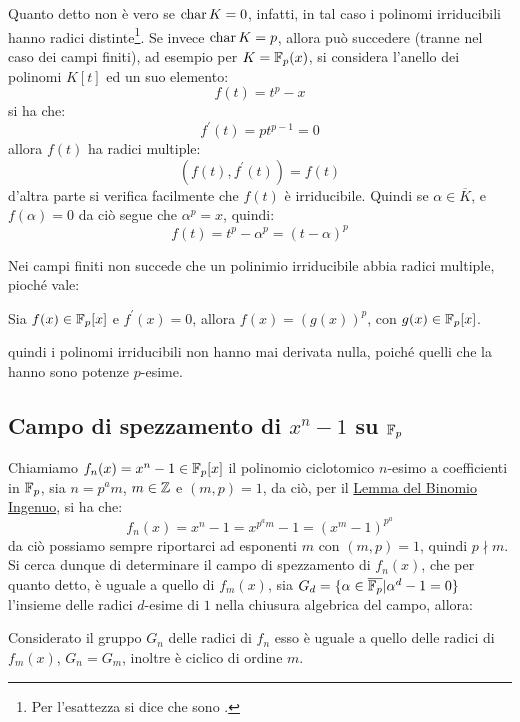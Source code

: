 \documentclass[11pt]{scrartcl}
\begin{document}
\begin{remark}
	Quanto detto non è vero se $\text{char}\, K = 0$, infatti, in tal caso i polinomi irriducibili hanno radici distinte\footnote{Per l'esattezza si dice che sono .}.
	Se invece $\text{char}\, K = p$, allora può succedere (tranne nel caso dei campi finiti), ad esempio per $K = {\mathbb F}_p(x)$, si considera l'anello dei polinomi $K[t]$ ed un suo elemento:
		\[f(t)=t^p-x
			\]
		si ha che:
		\[f^{\prime}(t)=pt^{p-1} = 0
			\]
	allora $f(t)$ ha radici multiple:
		\[ (f(t), f^{\prime}(t)) = f(t)
			\]
	d'altra parte si verifica facilmente che $f(t)$ è irriducibile. Quindi se $\alpha \in \overline K$, e $f(\alpha)=0$
	da ciò segue che $\alpha^p=x$, quindi:
		\[ f(t) = t^p - \alpha^p = (t-\alpha)^p
			\]
\end{remark}
	
Nei campi finiti non succede che un polinimio irriducibile abbia radici multiple, pioché vale:

\begin{theorem}
	Sia $f(x) \in {\mathbb F}_p[x]$ e $f^{\prime}(x) = 0$, allora $f(x)=(g(x))^p$,
	con $g(x)\in{\mathbb F}_p[x]$.
\end{theorem}

 quindi i polinomi irriducibili non hanno mai derivata nulla, poiché quelli che la hanno sono potenze $p$-esime.

\newpage
\subsection{Campo di spezzamento di $x^n-1$ su ${\mathbb F}_p$}
Chiamiamo $f_n(x)=x^n-1 \in {\mathbb F}_p[x]$ il polinomio ciclotomico $n$-esimo a coefficienti in ${\mathbb F}_p$,
sia $n=p^am$, $m \in \mathbb Z$ e $(m,p)=1$, da ciò, per il \hyperref[cf:bin]{Lemma del Binomio Ingenuo}, si ha che:
	\[f_n(x) = x^n - 1 = x^{p^am} - 1 = (x^m - 1)^{p^a}
		\]
da ciò possiamo sempre riportarci ad esponenti $m$ con $(m,p) = 1$, quindi $p \nmid m$. Si cerca dunque di
determinare il campo di spezzamento di $f_n(x)$, che per quanto detto, è uguale a quello di $f_m(x)$, sia 
$G_d = \{\alpha \in \overline{{\mathbb F}_p} | \alpha^d - 1 = 0\}$ l'insieme delle radici $d$-esime di $1$ nella chiusura algebrica del campo, allora:

\begin{lemma}
	\label{cf:lemma1}
	Considerato il gruppo $G_n$ delle radici di $f_n$ esso è uguale a quello delle radici di $f_m(x)$, $G_n = G_m$, inoltre è ciclico di ordine $m$.
\end{lemma}
\end{document}
